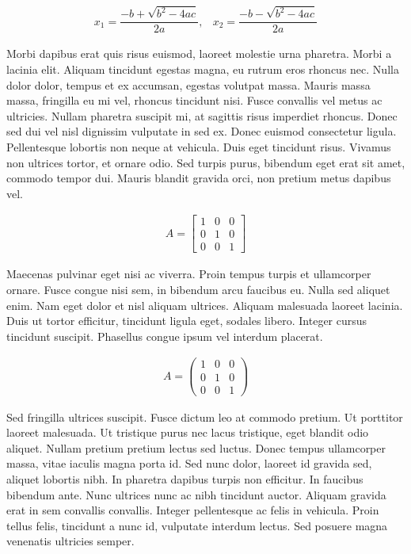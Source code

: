 \documentclass{article}
\begin{document}
	\begin{equation*}
		\begin{array}{cc}
			x_1 = \dfrac{-b + \sqrt{b^2 - 4ac}}{2a}, & 
			x_2 = \dfrac{-b - \sqrt{b^2 - 4ac}}{2a}
		\end{array}
	\end{equation*}

	Morbi dapibus erat quis risus euismod, laoreet molestie urna pharetra. Morbi a lacinia elit. Aliquam tincidunt egestas magna, eu rutrum eros rhoncus nec. Nulla dolor dolor, tempus et ex accumsan, egestas volutpat massa. Mauris massa massa, fringilla eu mi vel, rhoncus tincidunt nisi. Fusce convallis vel metus ac ultricies. Nullam pharetra suscipit mi, at sagittis risus imperdiet rhoncus. Donec sed dui vel nisl dignissim vulputate in sed ex. Donec euismod consectetur ligula. Pellentesque lobortis non neque at vehicula. Duis eget tincidunt risus. Vivamus non ultrices tortor, et ornare odio. Sed turpis purus, bibendum eget erat sit amet, commodo tempor dui. Mauris blandit gravida orci, non pretium metus dapibus vel.
	
	\begin{equation*}
		\begin{array}{cc}
			A= \begin{bmatrix}
				1 & 0 & 0 \\
				0 & 1 & 0 \\
				0 & 0 & 1
			   \end{bmatrix}
		\end{array}
	\end{equation*}

	Maecenas pulvinar eget nisi ac viverra. Proin tempus turpis et ullamcorper ornare. Fusce congue nisi sem, in bibendum arcu faucibus eu. Nulla sed aliquet enim. Nam eget dolor et nisl aliquam ultrices. Aliquam malesuada laoreet lacinia. Duis ut tortor efficitur, tincidunt ligula eget, sodales libero. Integer cursus tincidunt suscipit. Phasellus congue ipsum vel interdum placerat.
	
	\begin{equation*}
		\begin{array}{cc}
			A= \begin{pmatrix}
				1 & 0 & 0 \\
				0 & 1 & 0 \\
				0 & 0 & 1
	  			\end{pmatrix}
		\end{array}
	\end{equation*}
	
	Sed fringilla ultrices suscipit. Fusce dictum leo at commodo pretium. Ut porttitor laoreet malesuada. Ut tristique purus nec lacus tristique, eget blandit odio aliquet. Nullam pretium pretium lectus sed luctus. Donec tempus ullamcorper massa, vitae iaculis magna porta id. Sed nunc dolor, laoreet id gravida sed, aliquet lobortis nibh. In pharetra dapibus turpis non efficitur. In faucibus bibendum ante. Nunc ultrices nunc ac nibh tincidunt auctor. Aliquam gravida erat in sem convallis convallis. Integer pellentesque ac felis in vehicula. Proin tellus felis, tincidunt a nunc id, vulputate interdum lectus. Sed posuere magna venenatis ultricies semper.
\end{document}
